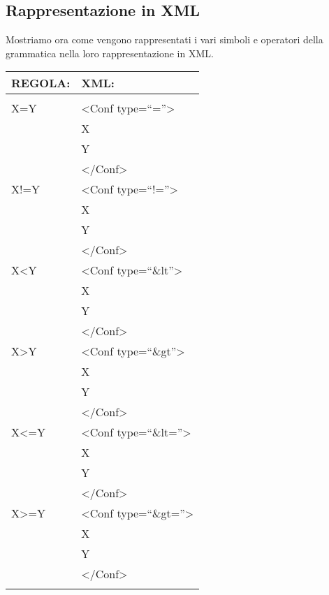 \subsection{Rappresentazione in XML}
Mostriamo ora come vengono rappresentati i vari simboli e operatori della grammatica nella loro rappresentazione in XML.
\begin{table}[htbp]
\begin{tabular}{||p{3cm}||p{6.5cm}||}
\hline
\textbf{REGOLA:} & \textbf{XML:} \\ \hline
& \\ \hline
X=Y & \textless Conf type=``=''\textgreater \\
&   X \\
&   Y \\ 
& \textless /Conf\textgreater \\ \hline
X!=Y & \textless Conf type=``!=''\textgreater \\
&  X \\
&  Y \\ 
& \textless /Conf\textgreater\\ \hline
X\textless Y & \textless Conf type=``\&lt''\textgreater \\
&  X \\
&  Y \\ 
& \textless /Conf\textgreater\\ \hline
X\textgreater Y & \textless Conf type=``\&gt''\textgreater \\
&  X \\
&  Y \\ 
& \textless /Conf\textgreater\\ \hline
X\textless=Y & \textless Conf type=``\&lt=''\textgreater \\
&  X \\
&  Y \\ 
& \textless /Conf\textgreater\\ \hline
X\textgreater =Y &  \textless Conf type=``\&gt=''\textgreater \\
&  X \\
&  Y \\ 
& \textless /Conf\textgreater\\ \hline
& \\ \hline
\end{tabular} \\
\end{table}

